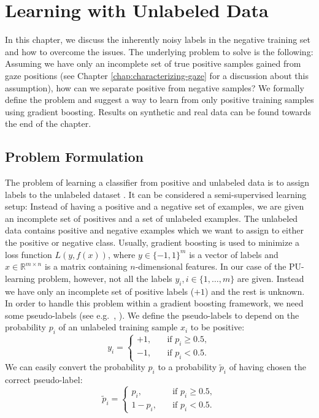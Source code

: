 \chapter{Learning with Unlabeled Data}
\label{chap:learning-with-unlabeled-data}
In this chapter, we discuss the inherently noisy labels in the negative training set and how to overcome the issues. 
The underlying problem to solve is the following: Assuming we have only an incomplete set of true positive samples gained from gaze positions (see Chapter \ref{chap:characterizing-gaze} for a discussion about this assumption), how can we separate positive from negative samples? We formally define the problem and suggest a way to learn from only positive training samples using gradient boosting. Results on synthetic and real data can be found towards the end of the chapter.

\section{Problem Formulation}
The problem of learning a classifier from positive and unlabeled data is to assign labels to the unlabeled dataset \cite{elkan2008learning}. 
It can be considered a semi-supervised learning setup: Instead of having a positive and a negative set of examples, we are given an incomplete set of positives and a set of unlabeled examples. 
The unlabeled data contains positive and negative examples which we want to assign to either the positive or negative class. 
Usually, gradient boosting is used to minimize a loss function $L(y,f(x))$, where $y \in \{-1,1\}^m$ is a vector of labels and $x \in \mathbb{R}^{m\times n}$ is a matrix containing $n$-dimensional features. In our case of the PU-learning problem, however, not all the labels $y_i, i \in \{1,\dots,m\}$ are given. 
Instead we have only an incomplete set of positive labels ($+1$) and the rest is unknown. In order to handle this problem within a gradient boosting framework, we need some pseudo-labels (see e.g.\ \cite{bennett2002exploiting}, \cite{mallapragada2009semiboost}). We define the pseudo-labels to depend on the probability $p_i$ of an unlabeled training sample $x_i$ to be positive:
\begin{equation*}
 y_i = 
    \begin{cases}
	+1, \quad & \text{if } p_i \geq 0.5, \\
	-1, \quad & \text{if } p_i < 0.5.
      \end{cases}
\end{equation*}
We can easily convert the probability $p_i$ to a probability $\tilde p_i$ of having chosen the correct pseudo-label:
\begin{equation*}
 \tilde p_i = 
    \begin{cases}
	p_i, \quad & \text{if } p_i \geq 0.5, \\
	1-p_i, \quad & \text{if } p_i < 0.5.
      \end{cases}
\end{equation*}


